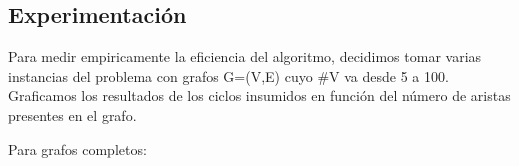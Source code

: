 \subsection{Experimentación}

Para medir empiricamente la eficiencia del algoritmo, decidimos tomar varias instancias del problema con grafos G=(V,E) cuyo $\#$V va desde 5 a 100. Graficamos los resultados de los ciclos insumidos en función del número de aristas presentes en el grafo.

Para grafos completos:
